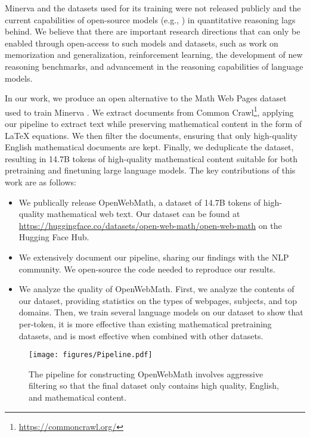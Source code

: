 Minerva and the datasets used for its training were not released publicly and the current capabilities of open-source models (e.g., \citet{touvron2023llama, llama2, codellama, openlm2023openllama, pythia}) in quantitative reasoning lags behind. We believe that there are important research directions that can only be enabled through open-access to such models and datasets, such as work on memorization and generalization, reinforcement learning, the development of new reasoning benchmarks, and advancement in the reasoning capabilities of language models.

In our work, we produce an open alternative to the Math Web Pages dataset used to train Minerva \citep{lewkowycz2022solving}. We extract documents from Common Crawl\footnote{\url{https://commoncrawl.org/}}, applying our pipeline to extract text while preserving mathematical content in the form of \LaTeX{} equations. We then filter the documents, ensuring that only high-quality English mathematical documents are kept. Finally, we deduplicate the dataset, resulting in 14.7B tokens of high-quality mathematical content suitable for both pretraining and finetuning large language models. The key contributions of this work are as follows:

\begin{itemize}
    \item We publically release OpenWebMath, a dataset of 14.7B tokens of high-quality mathematical web text. Our dataset can be found at \href{https://huggingface.co/datasets/open-web-math/open-web-math}{https://huggingface.co/datasets/open-web-math/open-web-math} on the Hugging Face Hub.
    \item We extensively document our pipeline, sharing our findings with the NLP community. We open-source the code needed to reproduce our results.
    \item We analyze the quality of OpenWebMath. First, we analyze the contents of our dataset, providing statistics on the types of webpages, subjects, and top domains. Then, we train several language models on our dataset to show that per-token, it is more effective than existing mathematical pretraining datasets, and is most effective when combined with other datasets.
\end{itemize}\begin{figure}[t!]
\begin{center}
\texttt{[image: figures/Pipeline.pdf]}
\end{center}
\caption{The pipeline for constructing OpenWebMath involves aggressive filtering so that the final dataset only contains high quality, English, and mathematical content.}
\label{fig:pipeline}
\end{figure}

